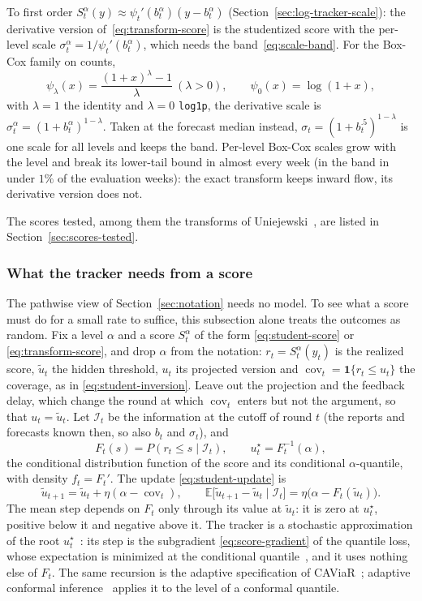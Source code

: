 \documentclass[11pt,a4paper]{article}
\newcommand{\ind}{\mathbf{1}}
\DeclareMathOperator{\cov}{cov}
\theoremstyle{definition}
\theoremstyle{remark}
\begin{document}
To first order $S_t^\alpha(y)\approx\psi_t'(b_t^\alpha)(y-b_t^\alpha)$
(Section~\ref{sec:log-tracker-scale}): the derivative version
of~\eqref{eq:transform-score} is the studentized score with the
per-level scale $\sigma_t^\alpha=1/\psi_t'(b_t^\alpha)$, which needs the
band~\eqref{eq:scale-band}. For the Box-Cox family on counts,
\[
 \psi_\lambda(x)=\frac{(1+x)^\lambda-1}{\lambda}\ (\lambda>0),\qquad
 \psi_0(x)=\log(1+x),
\]
with $\lambda=1$ the identity and $\lambda=0$ \texttt{log1p}, the
derivative scale is $\sigma_t^\alpha=(1+b_t^\alpha)^{1-\lambda}$. Taken at
the forecast median instead, $\sigma_t=(1+b_t^{.5})^{1-\lambda}$ is one
scale for all levels and keeps the band. Per-level Box-Cox scales grow
with the level and break its lower-tail bound in almost every week (in
the band in under $1\%$ of the evaluation weeks): the exact transform keeps
inward flow, its derivative version does not.

The scores tested, among them the transforms of Uniejewski~\cite{vst},
are listed in Section~\ref{sec:scores-tested}.

\subsubsection{What the tracker needs from a score}
\label{sec:quantile-stability}
The pathwise view of Section~\ref{sec:notation} needs no model. To see what
a score must do for a small rate to suffice, this subsection alone treats
the outcomes as random. Fix a level $\alpha$ and a score $S_t^\alpha$ of
the form \eqref{eq:student-score} or \eqref{eq:transform-score}, and drop
$\alpha$ from the notation: $r_t=S_t^\alpha(y_t)$ is the realized score,
$\tilde u_t$ the hidden threshold, $u_t$ its projected version and
$\cov_t=\ind\{r_t\le u_t\}$ the coverage, as in
\eqref{eq:student-inversion}. Leave out the projection and the feedback
delay, which change the round at which $\cov_t$ enters but not the
argument, so that $u_t=\tilde u_t$. Let $\mathcal I_t$ be the information
at the cutoff of round $t$ (the reports and forecasts known then, so also
$b_t$ and $\sigma_t$), and
\[
 F_t(s)=P(r_t\le s\mid\mathcal I_t),\qquad u_t^\star=F_t^{-1}(\alpha),
\]
the conditional distribution function of the score and its conditional
$\alpha$-quantile, with density $f_t=F_t'$. The update
\eqref{eq:student-update} is
\begin{equation}
 \tilde u_{t+1}=\tilde u_t+\eta(\alpha-\cov_t),\qquad
 \mathbb E\bigl[\tilde u_{t+1}-\tilde u_t\mid\mathcal I_t\bigr]
 =\eta\bigl(\alpha-F_t(\tilde u_t)\bigr).
 \label{eq:mean-step}
\end{equation}
The mean step depends on $F_t$ only through its value at $\tilde u_t$: it
is zero at $u_t^\star$, positive below it and negative above it. The
tracker is a stochastic approximation of the root
$u_t^\star$~\cite{robbins-monro}: its step is the subgradient
\eqref{eq:score-gradient} of the quantile loss, whose expectation is
minimized at the conditional quantile~\cite{koenker-bassett}, and it uses
nothing else of $F_t$. The same recursion is the adaptive specification of
CAViaR~\cite{caviar}; adaptive conformal inference~\cite{aci} applies it to
the level of a conformal quantile.
\end{document}
